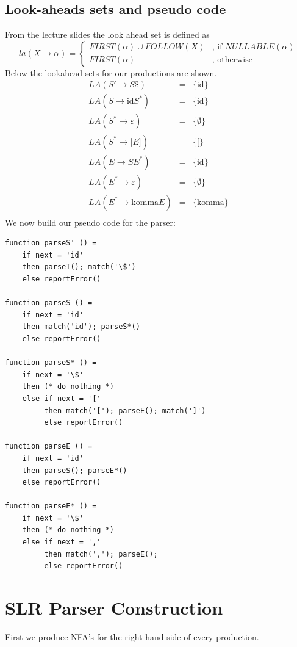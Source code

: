 \documentclass[11pt,a4paper]{article}
\begin{document}
\subsection{Look-aheads sets and pseudo code}
From the lecture slides the look ahead set is defined as
$$la(X\rightarrow\alpha)=
\begin{cases}
    FIRST(\alpha)\cup FOLLOW(X) & \textrm{, if }NULLABLE(\alpha)\\
    FIRST(\alpha)               & \textrm{, otherwise}
\end{cases}$$
Below the lookahead sets for our productions are shown.
$$
\begin{array}{lcl}
    LA(S' \rightarrow S\$)           & = &      \{\mathrm{id}\} \\
    LA(S \rightarrow \mathrm{id}S^{*})    & = &      \{\mathrm{id}\} \\
    LA(S^{*} \rightarrow \varepsilon)& = &      \{\emptyset\} \\
    LA(S^{*} \rightarrow \mathrm{[}E\mathrm{]})& = &      \{\mathrm{[}\} \\
    LA(E \rightarrow SE^{*})         & = &      \{\mathrm{id}\} \\
    LA(E^{*} \rightarrow \varepsilon)& = &      \{\emptyset\} \\
    LA(E^{*} \rightarrow \mathrm{komma}E)& = &  \{\mathrm{komma}\} \\
\end{array}
$$
We now build our pseudo code for the parser:
\begin{lstlisting}
function parseS' () = 
    if next = 'id' 
    then parseT(); match('\$')
    else reportError()

function parseS () =
    if next = 'id'
    then match('id'); parseS*()
    else reportError()

function parseS* () =
    if next = '\$'
    then (* do nothing *)
    else if next = '['
         then match('['); parseE(); match(']')
         else reportError()

function parseE () =
    if next = 'id'
    then parseS(); parseE*()
    else reportError()

function parseE* () =
    if next = '\$'
    then (* do nothing *)
    else if next = ','
         then match(','); parseE();
         else reportError()

\end{lstlisting}
\section{SLR Parser Construction}
First we produce NFA's for the right hand side of every production.
\end{document}
